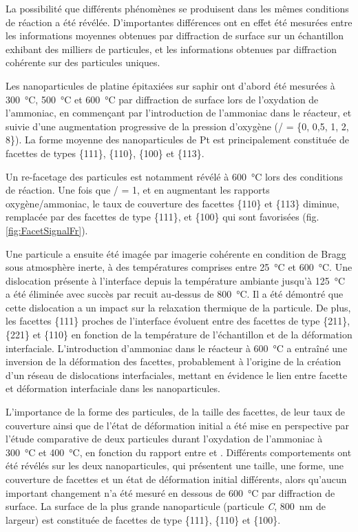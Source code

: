 La possibilité que différents phénomènes se produisent dans les mêmes conditions de réaction a été révélée.
D'importantes différences ont en effet été mesurées entre les informations moyennes obtenues par diffraction de surface sur un échantillon exhibant des milliers de particules, et les informations obtenues par diffraction cohérente sur des particules uniques.

Les nanoparticules de platine épitaxiées sur saphir ont d'abord été mesurées à \qty{300}{\degreeCelsius}, \qty{500}{\degreeCelsius} et \qty{600}{\degreeCelsius} par diffraction de surface lors de l'oxydation de l'ammoniac, en commençant par l'introduction de l'ammoniac dans le réacteur, et suivie d'une augmentation progressive de la pression d'oxygène (/ = \{0, 0,5, 1, 2, 8\}).
La forme moyenne des nanoparticules de Pt est principalement constituée de facettes de types \{111\}, \{110\}, \{100\} et \{113\}.

Un re-facetage des particules est notamment révélé à \qty{600}{\degreeCelsius} lors des conditions de réaction.
Une fois que / = 1, et en augmentant les rapports oxygène/ammoniac, le taux de couverture des facettes \{110\} et \{113\} diminue, remplacée par des facettes de type \{111\}, et \{100\} qui sont favorisées (fig. \ref{fig:FacetSignalFr}).

Une particule a ensuite été imagée par imagerie cohérente en condition de Bragg sous atmosphère inerte, à des températures comprises entre \qty{25}{\degreeCelsius} et \qty{600}{\degreeCelsius}.
Une dislocation présente à l'interface depuis la température ambiante jusqu'à \qty{125}{\degreeCelsius} a été éliminée avec succès par recuit au-dessus de \qty{800}{\degreeCelsius}.
Il a été démontré que cette dislocation a un impact sur la relaxation thermique de la particule.
De plus, les facettes \{111\} proches de l'interface évoluent entre des facettes de type \{211\}, \{221\} et \{110\} en fonction de la température de l'échantillon et de la déformation interfaciale.
L'introduction d'ammoniac dans le réacteur à \qty{600}{\degreeCelsius} a entraîné une inversion de la déformation des facettes, probablement à l'origine de la création d'un réseau de dislocations interfaciales, mettant en évidence le lien entre facette et déformation interfaciale dans les nanoparticules.

L'importance de la forme des particules, de la taille des facettes, de leur taux de couverture ainsi que de l'état de déformation initial a été mise en perspective par l'étude comparative de deux particules durant l'oxydation de l'ammoniac à \qty{300}{\degreeCelsius} et \qty{400}{\degreeCelsius}, en fonction du rapport entre  et .
Différents comportements ont été révélés sur les deux nanoparticules, qui présentent une taille, une forme, une couverture de facettes et un état de déformation initial différents, alors qu'aucun important changement n'a été mesuré en dessous de \qty{600}{\degreeCelsius} par diffraction de surface.
La surface de la plus grande nanoparticule (particule \textit{C}, \qty{800}{\nm} de largeur) est constituée de facettes de type \{111\}, \{110\} et \{100\}.

